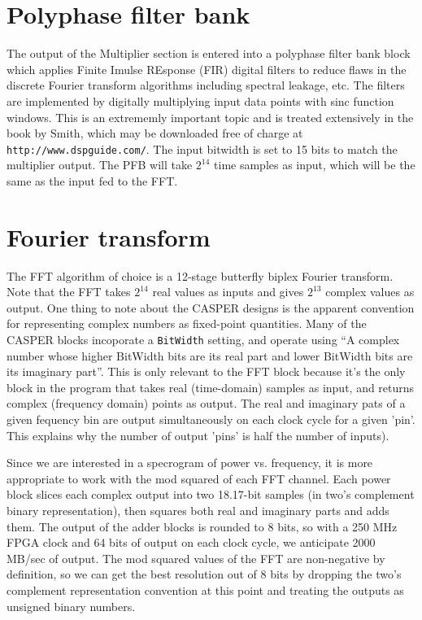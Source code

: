 \documentclass[a4paper,10pt]{article}
\begin{document}
\section{Polyphase filter bank}
The output of the Multiplier section is entered into a polyphase filter bank block which applies Finite Imulse REsponse (FIR) digital filters to reduce flaws in the discrete Fourier transform algorithms including spectral leakage, etc. The filters are implemented by digitally multiplying input data points with sinc function windows. This is an extrememly important topic and is treated extensively in the book by Smith, which may be downloaded free of charge at \texttt{http://www.dspguide.com/}. The input bitwidth is set to 15 bits to match the multiplier output. The PFB will take $2^{14}$ time samples as input, which will be the same as the input fed to the FFT.

\section{Fourier transform}
The FFT algorithm of choice is a 12-stage butterfly biplex Fourier transform. Note that the FFT takes $2^{14}$ real values as inputs and gives $2^{13}$ complex values as output. One thing to note about the CASPER designs is the apparent convention for representing complex numbers as fixed-point quantities. Many of the CASPER blocks incoporate a \texttt{BitWidth} setting, and operate using ``A complex number whose higher BitWidth bits are its real part and lower BitWidth bits are its imaginary part''. This is only relevant to the FFT block because it's the only block in the program that takes real (time-domain) samples as input, and returns complex (frequency domain) points as output. The real and imaginary pats of a given fequency bin are output simultaneously on each clock cycle for a given 'pin'. This explains why the number of output 'pins' is half the number of inputs).

Since we are interested in a specrogram of power vs. frequency, it is more appropriate to work with the mod squared of each FFT channel. Each power block slices each complex output into two 18.17-bit samples (in two's complement binary representation), then squares both real and imaginary parts and adds them. The output of the adder blocks is rounded to 8 bits, so with a 250 MHz FPGA clock and 64 bits of output on each clock cycle, we anticipate 2000 MB/sec of output. The mod squared values of the FFT are non-negative by definition, so we can get the best resolution out of 8 bits by dropping the two's complement representation convention at this point and treating the outputs as unsigned binary numbers.
\end{document}
